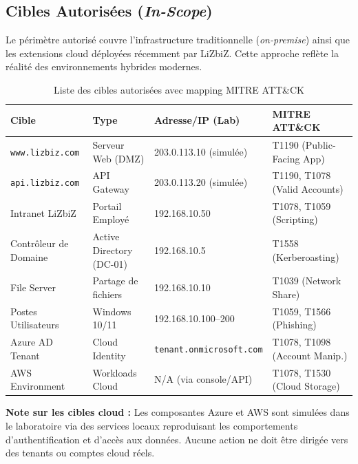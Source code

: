 \subsection{Cibles Autorisées (\textit{In-Scope})}

Le périmètre autorisé couvre l'infrastructure traditionnelle (\textit{on-premise})
ainsi que les extensions cloud déployées récemment par LiZbiZ. Cette approche
reflète la réalité des environnements hybrides modernes.

\begin{table}[htbp]
\centering
\caption{Liste des cibles autorisées avec mapping MITRE ATT\&CK}
\label{tab:cibles}
\begin{tabular}{p{3cm}p{2.8cm}p{2.8cm}p{3.5cm}}
\toprule
\textbf{Cible} & \textbf{Type} & \textbf{Adresse/IP (Lab)} & \textbf{MITRE ATT\&CK} \\
\midrule
\texttt{www.lizbiz.com}
    & Serveur Web (DMZ)
    & 203.0.113.10 (simulée)
    & T1190 (Public-Facing App) \\
\addlinespace
\texttt{api.lizbiz.com}
    & API Gateway
    & 203.0.113.20 (simulée)
    & T1190, T1078 (Valid Accounts) \\
\addlinespace
Intranet LiZbiZ
    & Portail Employé
    & 192.168.10.50
    & T1078, T1059 (Scripting) \\
\addlinespace
Contrôleur de Domaine
    & Active Directory (DC-01)
    & 192.168.10.5
    & T1558 (Kerberoasting) \\
\addlinespace
File Server
    & Partage de fichiers
    & 192.168.10.10
    & T1039 (Network Share) \\
\addlinespace
Postes Utilisateurs
    & Windows 10/11
    & 192.168.10.100--200
    & T1059, T1566 (Phishing) \\
\addlinespace
Azure AD Tenant
    & Cloud Identity
    & \texttt{tenant.onmicrosoft.com}
    & T1078, T1098 (Account Manip.) \\
\addlinespace
AWS Environment
    & Workloads Cloud
    & N/A (via console/API)
    & T1078, T1530 (Cloud Storage) \\
\bottomrule
\end{tabular}
\end{table}

\begin{boxinfo}
\textbf{Note sur les cibles cloud :} Les composantes Azure et AWS sont simulées
dans le laboratoire via des services locaux reproduisant les comportements
d'authentification et d'accès aux données. Aucune action ne doit être dirigée
vers des tenants ou comptes cloud réels.
\end{boxinfo}

